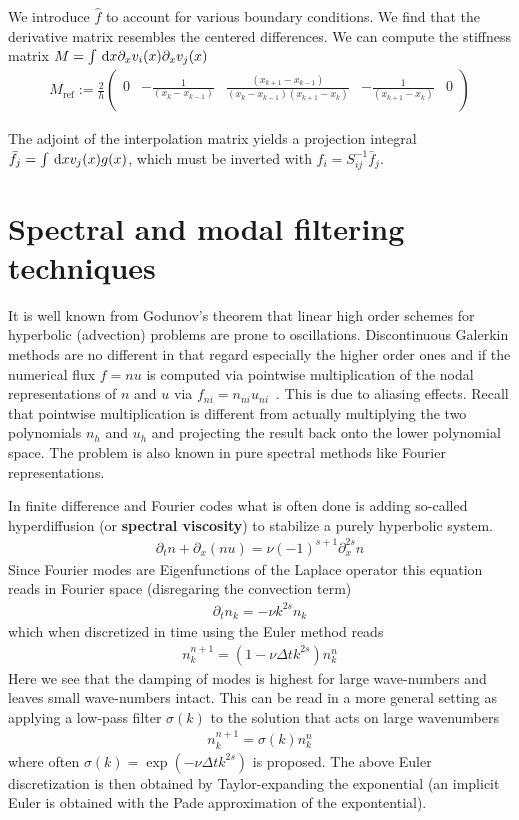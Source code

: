 We introduce $\hat f$ to account for various boundary conditions.
We find that the derivative matrix resembles the centered differences.
We can compute the stiffness matrix $M=\int\,\mathrm{d}x \partial_x v_i(x)\partial_x v_j(x)$
\begin{align}
    M_{\text{ref}} := \frac{2}{h}\begin{pmatrix}
        0 & -\frac{1}{(x_{k} - x_{k-1})} & \frac{(x_{k+1}-x_{k-1})}{(x_{k} - x_{k-1})(x_{k+1} - x_k)} & -\frac{1}{(x_{k+1} - x_k)} & 0 \\
    \end{pmatrix}
\end{align}

The adjoint of the interpolation matrix yields a projection integral $\bar f_j = \int \,\mathrm{d}x v_j(x) g(x)$, which must be inverted with $f_i = S_{ij}^{-1} \bar f_j$.


\section{Spectral and modal filtering techniques}
It is well known from Godunov's theorem that linear high order schemes for hyperbolic (advection) problems
are prone to oscillations. Discontinuous Galerkin methods are no different in that regard
especially the higher order ones and if the numerical flux $f=nu$ is computed via pointwise multiplication
of the nodal representations of $n$ and $u$ via $f_{ni} = n_{ni} u_{ni}$~\cite{NodalDG}.
This is due to aliasing effects. Recall that pointwise multiplication is different from
actually multiplying the two polynomials $n_h$ and $u_h$ and projecting the result back onto the
lower polynomial space. The problem is also known in pure spectral methods like
Fourier representations.

In finite difference and Fourier codes what is often done is adding so-called hyperdiffusion
(or \textbf{spectral viscosity}) to stabilize a purely hyperbolic system.
\begin{align}
    \partial_t n + \partial_x( nu) = \nu (-1)^{s+1}\partial_x^{2s} n
\end{align}
Since Fourier modes are Eigenfunctions of the Laplace operator this equation reads in Fourier space (disregaring the convection term)
\begin{align}
    \partial_t n_k = -\nu k^{2s} n_k
\end{align}
which when discretized in time using the Euler method reads
\begin{align}
    n_k^{n+1} = (1-\nu\Delta t k^{2s}) n_k^{n}
\end{align}
Here we see that the damping of modes is highest for large wave-numbers and leaves small wave-numbers intact.
This can be read in a more general setting as applying a low-pass filter $\sigma(k)$ to the solution that acts on large wavenumbers
\begin{align}
    n_k^{n+1} = \sigma(k) n_k^{n}
\end{align}
where often $\sigma(k) = \exp( - \nu \Delta t k^{2s})$ is proposed. The above Euler discretization is
then obtained by Taylor-expanding the exponential
(an implicit Euler is obtained with the Pade approximation of the expontential).

